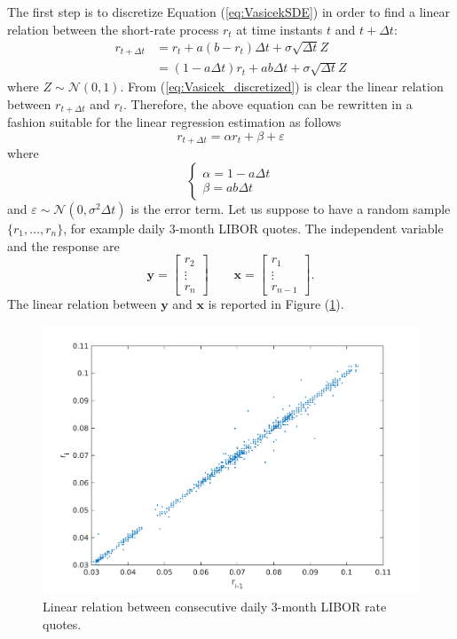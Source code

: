 The first step is to discretize Equation (\ref{eq:VasicekSDE}) in order to find a linear relation between the short-rate process $r_t$ at time instants $t$ and $t+\Delta t$:
\begin{align}\label{eq:Vasicek_discretized}
\nonumber
r_{t+\Delta t} & = r_t + a(b-r_t)\Delta t+\sigma\sqrt{\Delta t}Z \\
& = (1-a\Delta t)r_t+ab\Delta t+\sigma\sqrt{\Delta t}Z
\end{align}
where $Z \sim \mathcal{N}(0,1)$. From (\ref{eq:Vasicek_discretized}) is clear the linear relation between $r_{t+\Delta t}$ and $r_t$. Therefore, the above equation can be rewritten in a fashion suitable for the linear regression estimation as follows
\[
r_{t+\Delta t} = \alpha r_t + \beta + \varepsilon
\]
where 
\begin{equation*}
\begin{cases*}
\alpha = 1-a\Delta t\\
\beta = ab\Delta t
\end{cases*}
\end{equation*}
and $\varepsilon \sim \mathcal{N}(0,\sigma^2\Delta t)$ is the error term. Let us suppose to have a random sample $\{r_1,\ldots,r_n\}$, for example daily 3-month LIBOR quotes. The independent variable and the response are
\[ \bm{y} = \begin{bmatrix}
r_2\\
\vdots\\
r_n
\end{bmatrix} \qquad
\bm{x}= \begin{bmatrix}
r_1\\
\vdots\\
r_{n-1}
\end{bmatrix}.
\]
The linear relation between $\bm{y}$ and $\bm{x}$ is reported in Figure (\ref{fig:linear_regression}).

\begin{figure}
	\centering
	\includegraphics[scale=0.5]{Images/LinearRegression}
	\caption{Linear relation between consecutive daily 3-month LIBOR rate quotes. }
	\label{fig:linear_regression}
\end{figure}


